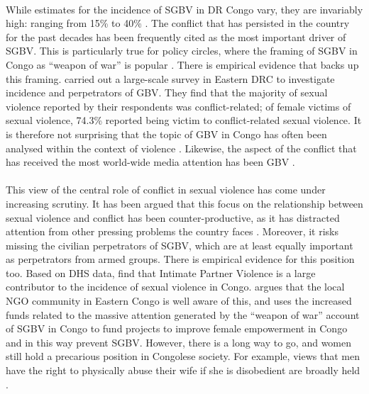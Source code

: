 \documentclass[11pt,a4paper]{scrartcl} %
\begin{document}
\paragraph{}
While estimates for the incidence of SGBV in DR Congo vary, they are invariably high: ranging from 15\% to 40\% \citep{Johnson2010,Peterman2011}. The conflict that has persisted in the country for the past decades has been frequently cited as the most important driver of SGBV. This is particularly true for policy circles, where the framing of SGBV in Congo as ``weapon of war'' is popular \citep{Baaz2013,Kirby2015}. There is empirical evidence that backs up this framing. \cite{Johnson2010} carried out a large-scale survey in Eastern DRC to investigate incidence and perpetrators of GBV. They find that the majority of sexual violence reported by their respondents was conflict-related; of female victims of sexual violence, 74.3\% reported being victim to conflict-related sexual violence. It is therefore not surprising that the topic of GBV in Congo has often been analysed within the context of violence \citep{Baaz2013}. Likewise, the aspect of the conflict that has received the most world-wide media attention has been GBV \citep{Autesserre2012a}.  
\paragraph{}
This view of the central role of conflict in sexual violence has come under increasing scrutiny. It has been argued that this focus on the relationship between sexual violence and conflict has been counter-productive, as it has distracted attention from other pressing problems the country faces \citep{Autesserre2012a, Hilhorst2018,Porter2019}. Moreover, it risks missing the civilian perpetrators of SGBV, which are at least equally important as perpetrators from armed groups. There is empirical evidence for this position too. Based on DHS data, \cite{Peterman2011} find that Intimate Partner Violence is a large contributor to the incidence of sexual violence in Congo. \cite{Hilhorst2018} argues that the local NGO community in Eastern Congo is well aware of this, and uses the increased funds related to the massive attention generated by the ``weapon of war'' account of SGBV in Congo to fund projects to improve female empowerment in Congo and in this way prevent SGBV.  However, there is a long way to go, and women still hold a precarious position in Congolese society. For example, views that men have the right to physically abuse their wife if she is disobedient are broadly held \citep{Quattrochi2019}.
\end{document}
